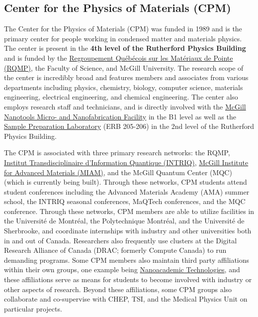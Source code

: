 \subsection*{Center for the Physics of Materials (CPM)}
The Center for the Physics of Materials (CPM) was funded in 1989 and is the primary center for people working in condensed matter and materials physics. The center is present in the \textbf{4th level of the Rutherford Physics Building} and is funded by the \href{https://rqmp.ca/}{Regroupement Québécois sur les Matériaux de Pointe (RQMP)}, the Faculty of Science, and McGill University. The research scope of the center is incredibly broad and features members and associates from various departments including physics, chemistry, biology, computer science, materials engineering, electrical engineering, and chemical engineering. The center also employs research staff and technicians, and is directly involved with the \href{https://www.mcgill.ca/microfab/}{McGill Nanotools Micro- and Nanofabrication Facility} in the B1 level as well as the \href{https://www.physics.mcgill.ca/preplab/}{Sample Preparation Laboratory} (ERB 205-206) in the 2nd level of the Rutherford Physics Building.

The CPM is associated with three primary research networks: the RQMP, \href{https://www.intriq.org/}{Institut Transdisciplinaire d'Information Quantique (INTRIQ)}, \href{https://www.mcgill.ca/miam/}{McGill Institute for Advanced Materials (MIAM)}, and the McGill Quantum Center (MQC) (which is currently being built). Through these networks, CPM students attend student conferences including the Advanced Materials Academy (AMA) summer school, the INTRIQ seasonal conferences, MaQTech conferences, and the MQC conference. Through these networks, CPM members are able to utilize facilities in the Université de Montréal, the 
Polytechnique Montréal, and the Université de Sherbrooke, and coordinate internships with industry and other universities both in and out of Canada. Researchers also frequently use  clusters at the Digital Research Alliance of Canada (DRAC; formerly Compute Canada) to run demanding programs. Some CPM members also maintain third party affiliations within their own groups, one example being \href{https://nanoacademic.com/}{Nanoacademic Technologies}, and these affiliations serve as means for students to become involved with industry or other aspects of research. Beyond these affiliations, some CPM groups also collaborate and co-supervise with CHEP, TSI, and the Medical Physics Unit on particular projects.

